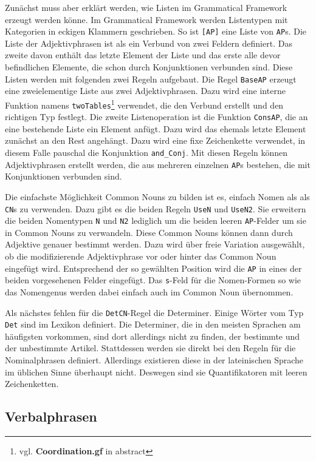 \documentclass[12pt,abstract=on,titlepage,bibliography=totoc,ngerman,listof=totoc]{scrreprt}
\begin{document}
Zunächst muss aber erklärt werden, wie Listen im Grammatical Framework erzeugt werden könne. Im Grammatical Framework werden Listentypen mit Kategorien in eckigen Klammern geschrieben. So ist \texttt{[AP]} eine Liste von \texttt{AP}s. Die Liste der Adjektivphrasen ist als ein Verbund von zwei Feldern definiert. Das zweite davon enthält das letzte Element der Liste und das erste alle devor befindlichen Elemente, die schon durch Konjunktionen verbunden sind. Diese Listen werden mit folgenden zwei Regeln aufgebaut. Die Regel \texttt{BaseAP} erzeugt eine zweielementige Liste aus zwei Adjektivphrasen. Dazu wird eine interne Funktion namens \texttt{twoTables}\footnote{vgl. \textbf{Coordination.gf} in abstract} verwendet, die den Verbund erstellt und den richtigen Typ festlegt. Die zweite Listenoperation ist die Funktion \texttt{ConsAP}, die an eine bestehende Liste ein Element anfügt. Dazu wird das ehemals letzte Element zunächst an den Rest angehängt. Dazu wird eine fixe Zeichenkette verwendet, in diesem Falle pauschal die Konjunktion \texttt{and\_Conj}. Mit diesen Regeln können Adjektivphrasen erstellt werden, die aus mehreren einzelnen \texttt{AP}s bestehen, die mit Konjunktionen verbunden sind.\par
Die einfachste Möglichkeit Common Nouns zu bilden ist es, einfach Nomen als als \texttt{CN}s zu verwenden. Dazu gibt es die beiden Regeln \texttt{UseN} und \texttt{UseN2}. Sie erweitern die beiden Nomentypen \texttt{N} und \texttt{N2} lediglich um die beiden leeren \texttt{AP}-Felder um sie in Common Nouns zu verwandeln. Diese Common Nouns können dann durch Adjektive genauer bestimmt werden. Dazu wird über freie Variation ausgewählt, ob die modifizierende Adjektivphrase vor oder hinter das Common Noun eingefügt wird. Entsprechend der so gewählten Position wird die \texttt{AP} in eines der beiden vorgesehenen Felder eingefügt. Das \texttt{s}-Feld für die Nomen-Formen so wie das Nomengenus werden dabei einfach auch im Common Noun übernommen. \par
Als nächstes fehlen für die \texttt{DetCN}-Regel die Determiner. Einige Wörter vom Typ \texttt{Det} sind im Lexikon definiert. Die Determiner, die in den meisten Sprachen am häufigsten vorkommen, sind dort allerdings nicht zu finden, der bestimmte und der unbestimmte Artikel. Stattdessen werden sie direkt bei den Regeln für die Nominalphrasen definiert. Allerdings existieren diese in der lateinischen Sprache im üblichen Sinne überhaupt nicht. Deswegen sind sie Quantifikatoren mit leeren Zeichenketten. 
\subsection{Verbalphrasen}
\label{subsec:verbalphrasen}
\end{document}

